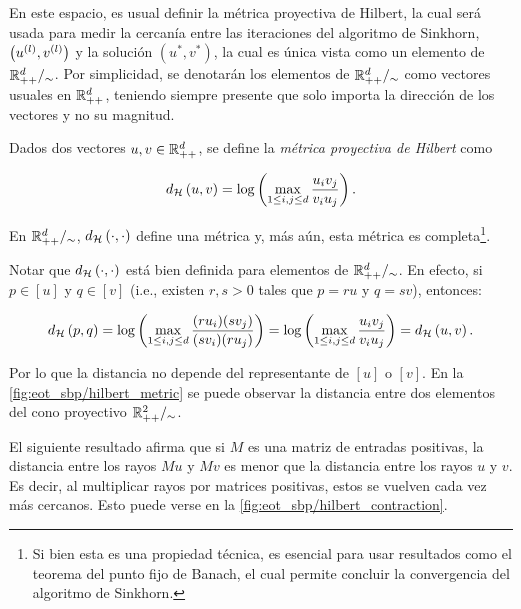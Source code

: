 En este espacio, es usual definir la métrica proyectiva de Hilbert, la cual será usada para medir la cercanía entre las iteraciones del algoritmo de Sinkhorn, $\left(u^{(l)}, v^{(l)}\right)$ y la solución $(u^*,v^*)$, la cual es única vista como un elemento de $\mathbb{R}^{d}_{++}/_\sim$. Por simplicidad, se denotarán los elementos de $\mathbb{R}^{d}_{++}/_\sim$ como vectores usuales en $\mathbb{R}_{++}^d$, teniendo siempre presente que solo importa la dirección de los vectores y no su magnitud.

\begin{prop}
	Dados dos vectores $u,v\in\mathbb{R}^d_{++}$, se define la \textit{métrica proyectiva de Hilbert} como

	\begin{equation}
		\label{eq:hilbert_metric}
		d_{\mathcal{H}}\left(u,v\right) = \log\left(\max_{1\leq i,j\leq d} \frac{u_i v_j}{v_i u_j}\right).
	\end{equation}

	En $\mathbb{R}^{d}_{++}/_\sim$, $d_{\mathcal{H}}\left(\cdot,\cdot\right)$ define una métrica y, más aún, esta métrica es completa\footnote{Si bien esta es una propiedad técnica, es esencial para usar resultados como el teorema del punto fijo de Banach, el cual permite concluir la convergencia del algoritmo de Sinkhorn.}.

\end{prop}

Notar que $d_{\mathcal{H}}\left(\cdot,\cdot\right)$ está bien definida para elementos de $\mathbb{R}^{d}_{++}/_\sim$. En efecto, si $p\in[u]$ y $q\in[v]$ (i.e., existen $r,s>0$ tales que $p=ru$ y $q=sv$), entonces:

\begin{equation*}
	d_{\mathcal{H}}\left(p,q\right)
	= \log\left(\max_{1\leq i,j\leq d} \frac{(ru_i)(sv_j)}{(sv_i)(ru_j)}\right)
	= \log\left(\max_{1\leq i,j\leq d} \frac{u_i v_j}{v_i u_j}\right)
	= d_{\mathcal{H}}\left(u,v\right).
\end{equation*}

Por lo que la distancia no depende del representante de $[u]$ o $[v]$. En la \autoref{fig:eot_sbp/hilbert_metric} se puede observar la distancia entre dos elementos del cono proyectivo $\mathbb{R}^{2}_{++}/_\sim$.


El siguiente resultado afirma que si $M$ es una matriz de entradas positivas, la distancia entre los rayos $Mu$ y $Mv$ es menor que la distancia entre los rayos $u$ y $v$. Es decir, al multiplicar rayos por matrices positivas, estos se vuelven cada vez más cercanos. Esto puede verse en la \autoref{fig:eot_sbp/hilbert_contraction}.

